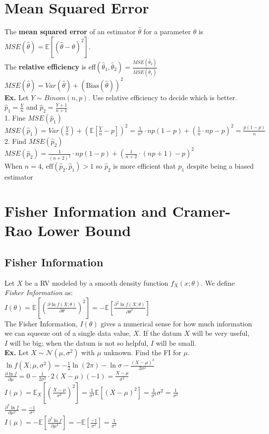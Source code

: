 \documentclass{article}
\begin{document}
\section{Mean Squared Error}
\label{sec:MSE}
The \textbf{mean squared error} of an estimator $\hat\theta$ for a parameter $\theta$ is $MSE(\hat\theta)=\mathbb{E}[(\hat\theta-\theta)^2]$.\\
The \textbf{relative efficiency} is eff$(\hat\theta_1,\hat\theta_2)=\frac{MSE(\hat\theta_2)}{MSE(\hat\theta_1)}$\\
$MSE(\hat\theta)=Var(\hat\theta)+(\text{Bias}(\hat\theta))^2$\\
\textbf{Ex.} Let $Y\sim Binom(n,p)$. Use relative efficiency to decide which is better. $\hat p_1=\frac{Y}{n}$ and $\hat p_2=\frac{Y+1}{n+1}$\\
1. Fine $MSE(\hat p_1)$\\
$MSE(\hat p_1)=Var(\frac{Y}{n})+(\mathbb{E}[\frac{Y}{n}-p])^2=\frac{1}{n^2}\cdot np(1-p)+(\frac{1}{n}\cdot np-p)^2=\frac{p(1-p)}{n}$\\
2. Find $MSE(\hat p_2)$\\
$MSE(\hat p_2)=\frac{1}{(n+2)^2}\cdot np(1-p)+(\frac{1}{n+2}\cdot(np+1)-p)^2$\\
When $n=4$, $\text{eff}(\hat p_2,\hat p_1)>1$ so $\hat p_2$ is more efficient that $\hat p_1$ despite being a biased estimator
\section{Fisher Information and Cramer-Rao Lower Bound}
\label{sec:fish}
\subsection{Fisher Information}
Let $X$ be a RV modeled by a smooth density function $f_X(x;\theta)$. We define \textit{Fisher Information} as:\\
$I(\theta)=\mathbb{E}[(\frac{\partial\ln f(X;\theta)}{\partial\theta})^2]=-\mathbb{E}[\frac{\partial^2\ln f(X;\theta)}{\partial\theta^2}]$\\
The Fisher Information, $I(\theta)$ gives a numerical sense for how much information we can squeeze out of a single data value, $X$. If the datum $X$ will be very useful, $I$ will be big; when the datum is not so helpful, $I$ will be small.\\
\textbf{Ex.} Let $X\sim\mathcal{N}(\mu,\sigma^2)$ with $\mu$ unknown. Find the FI for $\mu$.\\
$\ln f(X;\mu,\sigma^2)=-\frac{1}{2}\ln(2\pi)-\ln\sigma-\frac{(X-\mu)^2}{2\sigma^2}$\\
$\frac{\partial\ln f}{\partial\mu}=0-\frac{1}{2\sigma^2}\cdot2(X-\mu)(-1)=\frac{X-\mu}{\sigma^2}$\\
$I(\mu)=\mathbb{E}_X[(\frac{X-\mu}{\sigma^2})^2]=\frac{1}{\sigma^4}\mathbb{E}[(X-\mu)^2]=\frac{1}{\sigma^4}\sigma^2=\frac{1}{\sigma^2}$\\
$\frac{\partial^2\ln f}{\partial\mu^2}=\frac{-1}{\sigma^2}$\\
$I(\mu)=-\mathbb{E}[\frac{\partial^2\ln f}{\partial\mu^2}]=-\mathbb{E}[\frac{-1}{\sigma^2}]=\frac{1}{\sigma^2}$
\newpage
\end{document}

